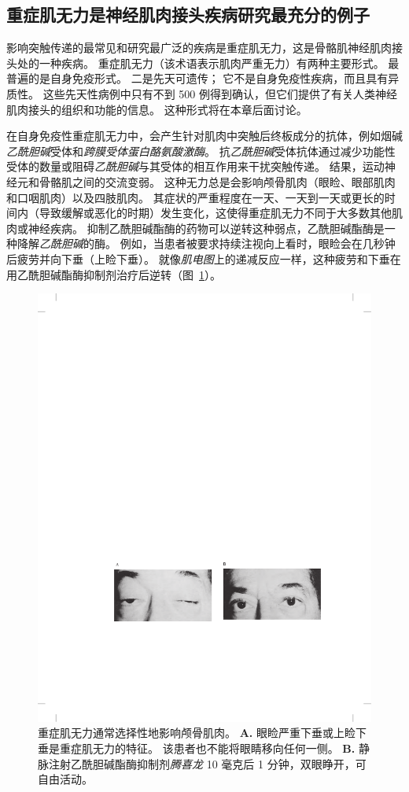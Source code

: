 \subsection{重症肌无力是神经肌肉接头疾病研究最充分的例子}

影响突触传递的最常见和研究最广泛的疾病是重症肌无力，这是骨骼肌神经肌肉接头处的一种疾病。
重症肌无力（该术语表示肌肉严重无力）有两种主要形式。
最普遍的是自身免疫形式。
二是先天可遗传；
它不是自身免疫性疾病，而且具有异质性。
这些先天性病例中只有不到 500 例得到确认，但它们提供了有关人类神经肌肉接头的组织和功能的信息。
这种形式将在本章后面讨论。


在自身免疫性重症肌无力中，会产生针对肌肉中突触后终板成分的抗体，例如烟碱\textit{乙酰胆碱}受体和\textit{跨膜受体蛋白酪氨酸激酶}。
抗\textit{乙酰胆碱}受体抗体通过减少功能性受体的数量或阻碍\textit{乙酰胆碱}与其受体的相互作用来干扰突触传递。
结果，运动神经元和骨骼肌之间的交流变弱。
这种无力总是会影响颅骨肌肉（眼睑、眼部肌肉和口咽肌肉）以及四肢肌肉。
其症状的严重程度在一天、一天到一天或更长的时间内（导致缓解或恶化的时期）发生变化，这使得重症肌无力不同于大多数其他肌肉或神经疾病。
抑制乙酰胆碱酯酶的药物可以逆转这种弱点，乙酰胆碱酯酶是一种降解\textit{乙酰胆碱}的酶。
例如，当患者被要求持续注视向上看时，眼睑会在几秒钟后疲劳并向下垂（上睑下垂）。
就像\textit{肌电图}上的递减反应一样，这种疲劳和下垂在用乙酰胆碱酯酶抑制剂治疗后逆转（图~\ref{fig:57_7}）。


\begin{figure}[htbp]
	\centering
	\includegraphics[width=0.89\linewidth]{chap57/fig_57_7}
	\caption{重症肌无力通常选择性地影响颅骨肌肉。
		\textbf{A.} 眼睑严重下垂或上睑下垂是重症肌无力的特征。
		该患者也不能将眼睛移向任何一侧。
		\textbf{B.} 静脉注射乙酰胆碱酯酶抑制剂\textit{腾喜龙} 10 毫克后 1 分钟，双眼睁开，可自由活动。}
	\label{fig:57_7}
\end{figure}


